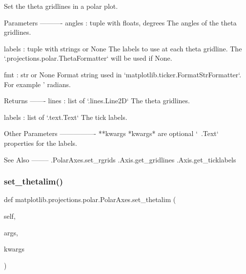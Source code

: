 \begin{DoxyVerb}Set the theta gridlines in a polar plot.

Parameters
----------
angles : tuple with floats, degrees
    The angles of the theta gridlines.

labels : tuple with strings or None
    The labels to use at each theta gridline. The
    `.projections.polar.ThetaFormatter` will be used if None.

fmt : str or None
    Format string used in `matplotlib.ticker.FormatStrFormatter`.
    For example '%
    radians.

Returns
-------
lines : list of `.lines.Line2D`
    The theta gridlines.

labels : list of `.text.Text`
    The tick labels.

Other Parameters
----------------
**kwargs
    *kwargs* are optional `~.Text` properties for the labels.

See Also
--------
.PolarAxes.set_rgrids
.Axis.get_gridlines
.Axis.get_ticklabels
\end{DoxyVerb}
 \mbox{\label{classmatplotlib_1_1projections_1_1polar_1_1PolarAxes_a414ec44db139075be05e6b908023574e}} 
\subsubsection{\texorpdfstring{set\+\_\+thetalim()}{set\_thetalim()}}
{\footnotesize\ttfamily def matplotlib.\+projections.\+polar.\+Polar\+Axes.\+set\+\_\+thetalim (\begin{DoxyParamCaption}\item[{}]{self,  }\item[{}]{args,  }\item[{}]{kwargs }\end{DoxyParamCaption})}

